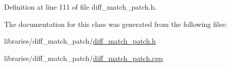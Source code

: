 Definition at line 111 of file diff\_\-match\_\-patch.h.



The documentation for this class was generated from the following files:\begin{DoxyCompactItemize}
\item 
libraries/diff\_\-match\_\-patch/\hyperlink{diff__match__patch_8h}{diff\_\-match\_\-patch.h}\item 
libraries/diff\_\-match\_\-patch/\hyperlink{diff__match__patch_8cpp}{diff\_\-match\_\-patch.cpp}\end{DoxyCompactItemize}
